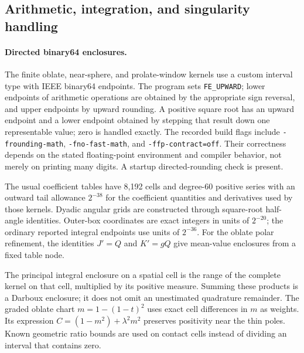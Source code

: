 \subsection{Arithmetic, integration, and singularity handling}
\label{subsec:computational-methods}

\paragraph{Directed binary64 enclosures.}
The finite oblate, near-sphere, and prolate-window kernels use a
custom interval type with IEEE binary64 endpoints.  The program sets
\texttt{FE\_UPWARD}; lower endpoints of arithmetic operations are
obtained by the appropriate sign reversal, and upper endpoints by
upward rounding.  A positive square root has an upward endpoint
and a lower endpoint obtained by stepping that result down one
representable value; zero is handled exactly.  The recorded build flags
include \texttt{-frounding-math}, \texttt{-fno-fast-math}, and
\texttt{-ffp-contract=off}.  Their correctness depends on the stated
floating-point environment and compiler behavior, not merely on
printing many digits.  A startup directed-rounding check is present.

The usual coefficient tables have 8,192 cells and degree-60 positive
series with an outward tail allowance $2^{-38}$ for the coefficient
quantities and derivatives used by those kernels.
Dyadic angular grids are constructed through square-root half-angle
identities.  Outer-box coordinates are exact integers in units of
$2^{-20}$; the ordinary reported integral endpoints use units of
$2^{-36}$.  For the oblate polar refinement, the identities
$J'=Q$ and $K'=gQ$ give mean-value enclosures from a fixed table node.

The principal integral enclosure on a spatial cell is the range of
the complete kernel on that cell, multiplied by its positive measure.
Summing these products is a Darboux enclosure; it does not omit an
unestimated quadrature remainder.  The graded oblate chart
$m=1-(1-t)^2$ uses exact cell differences in $m$ as weights.
Its expression $C=(1-m^2)+\lambda^2m^2$ preserves positivity near
the thin poles.  Known geometric ratio bounds are used on contact
cells instead of dividing an interval that contains zero.

